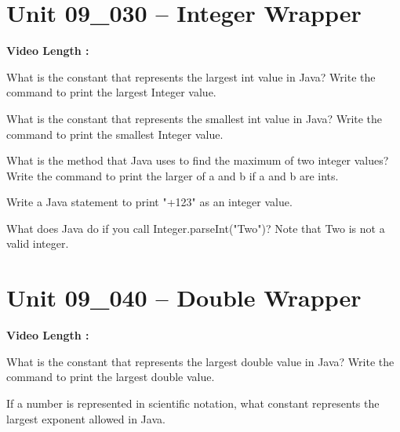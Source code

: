 \documentclass[letterpaper,12pt]{exam}
\newcommand{\unit}{Unit 09}
\begin{document}
\begin{questions}
\section*{\unit\_030 -- Integer Wrapper} 
\par{\selectfont\textbf{Video Length :}}
\begin{samepage}
    \question What is the constant that represents the largest int value in Java?  Write the command to print the largest Integer value.
    \vspace{5mm}
\end{samepage}

\begin{samepage}
    \question What is the constant that represents the smallest int value in Java?  Write the command to print the smallest Integer value.
    \vspace{5mm}
\end{samepage}

\begin{samepage}
    \question What is the method that Java uses to find the maximum of two integer values?  Write the command to print the larger of a and b if a and b are ints.
    \vspace{5mm}
\end{samepage}

\begin{samepage}
    \question Write a Java statement to print "+123" as an integer value.
    \vspace{5mm}
\end{samepage}
\begin{samepage}
    \question What does Java do if you call Integer.parseInt("Two")?  Note that Two is not a valid integer. 
    \vspace{5mm}
\end{samepage}


\section*{\unit\_040 -- Double Wrapper } 
\par{\selectfont\textbf{Video Length :}}
\begin{samepage}
    \question What is the constant that represents the largest double value in Java?  Write the command to print the largest double value.
    \vspace{5mm}
\end{samepage}

\begin{samepage}
    \question If a number is represented in scientific notation, what constant represents the largest exponent allowed in Java.
    \vspace{5mm}
\end{samepage}



\end{questions}
\end{document}
